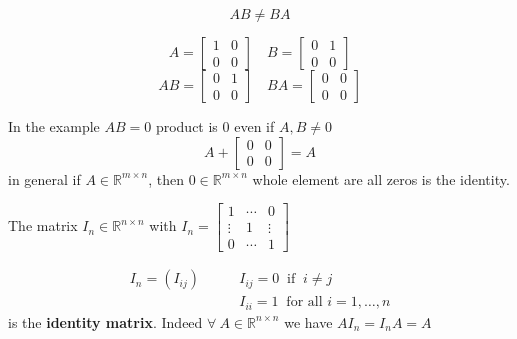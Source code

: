 $$AB \not = BA$$
\begin{example}
    $$A = \begin{bmatrix}
        1 &0\\
        0 & 0
    \end{bmatrix} \quad B = \begin{bmatrix}
        0 &1\\
        0 &0
    \end{bmatrix}$$
    $$AB = \begin{bmatrix}
        0 &1\\
        0 & 0
    \end{bmatrix} \quad BA =\begin{bmatrix}
        0 &0\\
        0 & 0
    \end{bmatrix}$$
\end{example}
In the example $AB = 0$ product is $0$ even if $A, B \not = 0$
$$A + \begin{bmatrix}
        0 &0\\
        0 & 0
    \end{bmatrix} = A$$
in general if $A \in \mathbb{R}^{m \times n}$, then $0  \in \mathbb{R}^{m \times n}$ whole element are all zeros is the identity.
\begin{definition}
    The matrix $I_n \in \mathbb{R}^{n \times n}$ with $I_n = \begin{bmatrix}
        1 &\cdots &0\\
        \vdots &1 &\vdots \\
        0 &\cdots & 1
    \end{bmatrix}$
    
    \begin{align*}
        I_n = \left(I_{ij}\right) \qquad &I_{ij} = 0 \ \text{ if } \ i \not = j\\
        &I_{ii} = 1 \ \text{ for all } i = 1, \dots, n 
    \end{align*}
    is the \textbf{identity matrix}. Indeed $\forall \ A \in \mathbb{R}^{n \times n}$ we have $AI_n = I_nA = A$ 
\end{definition}
